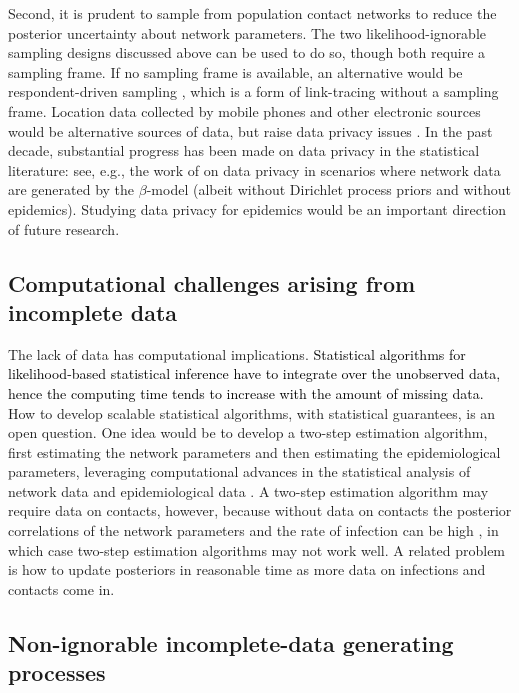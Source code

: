 \documentclass[12pt,usenatbib,referee]{article}
\renewcommand{\alert}{\textcolor{black}}
\begin{document}
Second,
it is prudent to sample from population contact networks to reduce the posterior uncertainty about network parameters.
The two likelihood-ignorable sampling designs discussed above can be used to do so,
though both require a sampling frame.
If no sampling frame is available,
an alternative would be respondent-driven sampling \citep[e.g.,][]{GiHa10,Gi11},
which is a form of link-tracing without a sampling frame.
Location data collected by mobile phones and other electronic sources would be alternative sources of data,
but raise data privacy issues \citep{FiSa10}.
In the past decade,
substantial progress has been made on data privacy in the statistical literature:
see,
e.g.,
the work of \citet{karwa2016inference} on data privacy in scenarios where network data are generated by the $\beta$-model (albeit without Dirichlet process priors and without epidemics).
Studying data privacy for epidemics would be an important direction of future research.

\subsection{Computational challenges arising from incomplete data}
\label{comp}

The lack of data has computational implications.
\alert{Statistical algorithms for likelihood-based statistical inference \citep*[e.g., EM algorithms,][]{DeLaRu77} have to integrate over the unobserved data,
hence the computing time tends to increase with the amount of missing data.}
How to develop scalable statistical algorithms,
with statistical guarantees, 
is an open question.
One idea would be to develop a two-step estimation algorithm,
first estimating the network parameters and then estimating the epidemiological parameters,
leveraging computational advances in the statistical analysis of network data \citep[e.g.,][]{RaNiHoYe12,STMu13} and epidemiological data \citep{beast}.
A two-step estimation algorithm may require data on contacts,
however,
because without data on contacts the posterior correlations of the network parameters and the rate of infection can be high \citep{GrWeHu10},
in which case two-step estimation algorithms may not work well.
A related problem is how to update posteriors in reasonable time as more data on infections and contacts come in.

\subsection{Non-ignorable incomplete-data generating processes}
\end{document}
